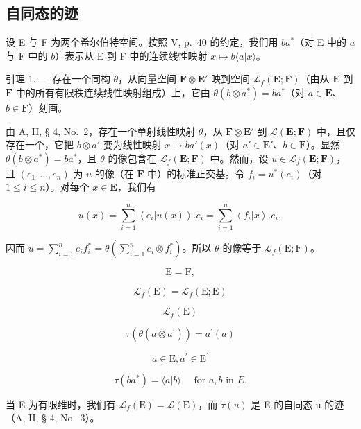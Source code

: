 \subsection{自同态的迹}

设 E 与 F 为两个希尔伯特空间。按照 V, p.~40 的约定，我们用 \(ba^{*}\)（对 E 中的 \(a\) 与 F 中的 \(b\)）表示从 E 到 F 中的连续线性映射 \(x \mapsto b \langle a|x\rangle\)。

引理 1. --- 存在一个同构 \(\theta\)，从向量空间 \(\mathbf{F} \otimes \mathbf{E}'\) 映到空间 \(\mathcal{L}_f(\mathbf{E}; \mathbf{F})\)（由从 \(\mathbf{E}\) 到 \(\mathbf{F}\) 中的所有有限秩连续线性映射组成）上，它由 \(\theta(b \otimes a^*) = ba^*\)（对 \(a \in \mathbf{E}\)、\(b \in \mathbf{F}\)）刻画。

由 A, II, § 4, No.~2，存在一个单射线性映射 \(\theta\)，从 \(\mathbf{F} \otimes \mathbf{E}'\) 到 \(\mathcal{L}(\mathbf{E};\mathbf{F})\) 中，且仅存在一个，它把 \(b \otimes a'\) 变为线性映射 \(x \mapsto ba'(x)\)（对 \(a' \in \mathbf{E}'\)、\(b \in \mathbf{F}\)）。显然 \(\theta(b \otimes a^*) = ba^*\)，且 \(\theta\) 的像包含在 \(\mathcal{L}_f(\mathbf{E};\mathbf{F})\) 中。然而，设 \(u \in \mathcal{L}_f(\mathbf{E};\mathbf{F})\)，且 \((e_1,\dots,e_n)\) 为 \(u\) 的像（在 \(\mathbf{F}\) 中）的标准正交基。令 \(f_i = u^*(e_i)\)（对 \(1 \leqslant i \leqslant n\)）。对每个 \(x \in \mathbf{E}\)，我们有

\[
u (x) = \sum_ {i = 1} ^ {n} \left\langle e _ {i} | u (x) \right\rangle . e _ {i} = \sum_ {i = 1} ^ {n} \left\langle f _ {i} | x \right\rangle . e _ {i},
\]

因而 \(u = \sum_{i=1}^{n} e_i f_i^* = \theta(\sum_{i=1}^{n} e_i \otimes f_i^*)\)。所以 \(\theta\) 的像等于 \(\mathcal{L}_f(\mathrm{E};\mathrm{F})\)。

\[
\mathrm{E} = \mathrm{F},
\]

\[
\mathscr {L} _ {f} (\mathrm{E}) = \mathscr {L} _ {f} (\mathrm{E}; \mathrm{E})
\]

\[
\mathcal {L} _ {f} (\mathrm{E})
\]

\[
\tau (\theta (a \otimes a ^ {\prime})) = a ^ {\prime} (a)
\]

\[
a \in \mathrm{E}, a ^ {\prime} \in \mathrm{E} ^ {\prime}\tag{22}
\]

\[
\tau (b a ^ {*}) = \langle a | b \rangle \quad \text { for } a, b \text { in } E.
\]

当 E 为有限维时，我们有 \(\mathcal{L}_{f}(\mathrm{E}) = \mathcal{L}(\mathrm{E})\)，而 \(\tau(u)\) 是 E 的自同态 u 的迹（A, II, § 4, No.~3）。

